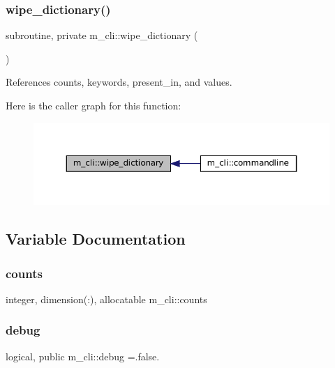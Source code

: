\subsubsection{\texorpdfstring{wipe\+\_\+dictionary()}{wipe\_dictionary()}}
{\footnotesize\ttfamily subroutine, private m\+\_\+cli\+::wipe\+\_\+dictionary (\begin{DoxyParamCaption}{ }\end{DoxyParamCaption})\hspace{0.3cm}{\ttfamily [private]}}



References counts, keywords, present\+\_\+in, and values.

Here is the caller graph for this function\+:\nopagebreak
\begin{figure}[H]
\begin{center}
\leavevmode
\includegraphics[width=350pt]{namespacem__cli_a3c1b30406fc692841826be979726bb1b_icgraph}
\end{center}
\end{figure}


\subsection{Variable Documentation}
\mbox{\label{namespacem__cli_ac6af3775222feedc5aff5874ce63897a}} 
\subsubsection{\texorpdfstring{counts}{counts}}
{\footnotesize\ttfamily integer, dimension(\+:), allocatable m\+\_\+cli\+::counts\hspace{0.3cm}{\ttfamily [private]}}

\mbox{\label{namespacem__cli_a83b45c240c1c7309a38c358ebcde28ec}} 
\subsubsection{\texorpdfstring{debug}{debug}}
{\footnotesize\ttfamily logical, public m\+\_\+cli\+::debug =.false.}

